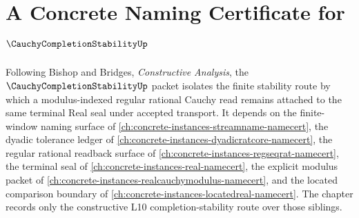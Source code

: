 \chapter{A Concrete Naming Certificate for $\CauchyCompletionStabilityUp$}
\label{ch:concrete-instances-cauchycompletionstability-namecert}

Following Bishop and Bridges, \emph{Constructive Analysis}, the $\CauchyCompletionStabilityUp$ packet isolates the finite stability route by which a modulus-indexed regular rational Cauchy read remains attached to the same terminal Real seal under accepted transport. It depends on the finite-window naming surface of \autoref{ch:concrete-instances-streamname-namecert}, the dyadic tolerance ledger of \autoref{ch:concrete-instances-dyadicratcore-namecert}, the regular rational readback surface of \autoref{ch:concrete-instances-regseqrat-namecert}, the terminal seal of \autoref{ch:concrete-instances-real-namecert}, the explicit modulus packet of \autoref{ch:concrete-instances-realcauchymodulus-namecert}, and the located comparison boundary of \autoref{ch:concrete-instances-locatedreal-namecert}. The chapter records only the constructive L10 completion-stability route over those siblings.

